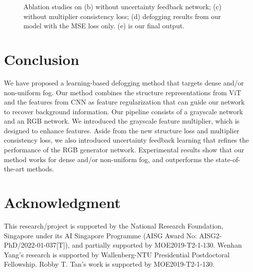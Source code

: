 \documentclass[runningheads]{llncs}
\begin{document}
\begin{figure}[t!]
	\captionsetup[subfigure]{font=small, labelformat=empty}
	\captionsetup[subfloat]{farskip=1pt}
	\centering
	\setcounter{subfigure}{0}
	\hfill
	\hfill
	\hfill
	\hfill
	\hfill
	\caption{Ablation studies on
		(b) without uncertainty feedback network; 
		(c) without multiplier consistency loss; 
		(d) defogging results from our model with the MSE loss only.
		(e) is our final output. }
	\label{fig:ablation}
\end{figure}

\section{Conclusion}
\label{sec:outro}
We have proposed a learning-based defogging method that targets dense and/or non-uniform fog.
Our method combines the structure representations from ViT and the features from CNN as feature regularization that can guide our network to recover background information.
Our pipeline consists of a grayscale network and an RGB network. 
We introduced the grayscale feature multiplier, which is designed to enhance features.
Aside from the new structure loss and multiplier consistency loss, we also introduced uncertainty feedback learning that refines the performance of the RGB generator network. 
Experimental results show that our method works for dense and/or non-uniform fog, and outperforms the state-of-the-art methods.

\section*{Acknowledgment}
This research/project is supported by the National Research Foundation, Singapore under its AI Singapore Programme (AISG Award No: AISG2-PhD/2022-01-037[T]), and partially supported by MOE2019-T2-1-130. Wenhan Yang's research is supported by Wallenberg-NTU Presidential Postdoctoral Fellowship. Robby T. Tan's work is supported by MOE2019-T2-1-130. 




\end{document}
